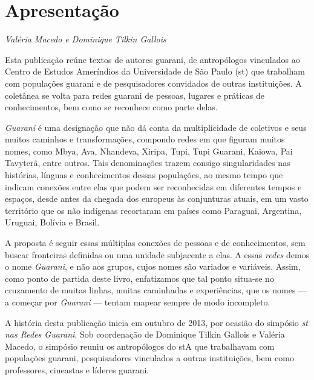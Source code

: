 \chapter{Apresentação}
\begin{flushright}
\emph{Valéria Macedo e Dominique Tilkin Gallois}
\end{flushright}

\medskip
Esta publicação reúne textos de autores guarani, de antropólogos
vinculados ao Centro de Estudos Ameríndios da Universidade de São Paulo
(st) que trabalham com populações guarani e de pesquisadores
convidados de outras instituições. A coletânea se volta para redes
guarani de pessoas, lugares e práticas de conhecimentos, bem como se
reconhece como parte delas. 

\emph{Guarani} é uma designação que não dá conta da multiplicidade de coletivos
e seus muitos caminhos e transformações, compondo redes em que figuram
muitos nomes, como Mbya, Ava, Nhandeva, Xiripa, Tupi, Tupi Guarani,
Kaiowa, Pai Tavyterã, entre outros. Tais denominações trazem consigo
singularidades nas histórias, línguas e conhecimentos dessas
populações, ao mesmo tempo que indicam conexões entre elas que podem
ser reconhecidas em diferentes tempos e espaços, desde antes da chegada
dos europeus às conjunturas atuais, em um vasto território que os não
indígenas recortaram em países como Paraguai, Argentina, Uruguai,
Bolívia e Brasil.

A proposta é seguir essas múltiplas conexões de pessoas e de
conhecimentos, sem buscar fronteiras definidas ou uma unidade
subjacente a elas. A essas \emph{redes} demos o nome \emph{Guarani}, e não aos
grupos, cujos nomes são variados e variáveis. Assim, como ponto de
partida deste livro, enfatizamos que tal ponto situa-se no cruzamento
de muitas linhas, muitas caminhadas e experiências, que os nomes --- a
começar por \emph{Guarani} --- tentam mapear sempre de modo incompleto.

A história desta publicação inicia em outubro de 2013, por ocasião do
simpósio \emph{st nas Redes Guarani}.  Sob coordenação de Dominique Tilkin
Gallois e Valéria Macedo, o simpósio reuniu os antropólogos do stA
que trabalhavam com populações guarani, pesquisadores vinculados a
outras instituições, bem como professores, cineastas e líderes guarani.

